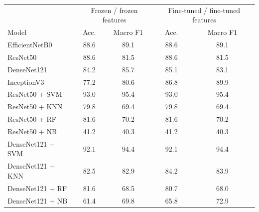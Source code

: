 \begin{tabular}{lcccc}
\toprule
 & \multicolumn{2}{c}{Frozen / frozen features} & \multicolumn{2}{c}{Fine-tuned / fine-tuned features} \\
Model & Acc. & Macro F1 & Acc. & Macro F1 \\
\midrule
EfficientNetB0 & 88.6 & 89.1 & 88.6 & 89.1 \\
ResNet50 & 88.6 & 81.5 & 88.6 & 81.5 \\
DenseNet121 & 84.2 & 85.7 & 85.1 & 83.1 \\
InceptionV3 & 77.2 & 80.6 & 86.8 & 89.9 \\
\midrule
ResNet50 + SVM & 93.0 & 95.4 & 93.0 & 95.4 \\
ResNet50 + KNN & 79.8 & 69.4 & 79.8 & 69.4 \\
ResNet50 + RF & 81.6 & 70.2 & 81.6 & 70.2 \\
ResNet50 + NB & 41.2 & 40.3 & 41.2 & 40.3 \\
DenseNet121 + SVM & 92.1 & 94.4 & 92.1 & 94.4 \\
DenseNet121 + KNN & 82.5 & 82.9 & 84.2 & 83.9 \\
DenseNet121 + RF & 81.6 & 68.5 & 80.7 & 68.0 \\
DenseNet121 + NB & 61.4 & 69.8 & 65.8 & 72.9 \\
\bottomrule
\end{tabular}
